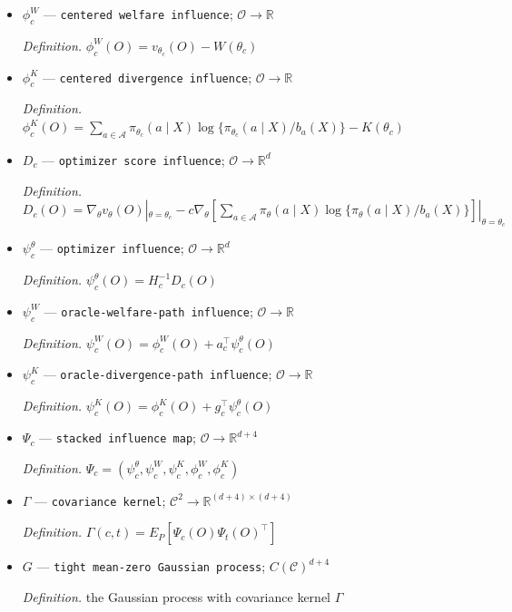 \documentclass{article}
\begin{document}
\begin{itemize}
  \item \(\phi^W_c\) --- \texttt{centered welfare influence}; \(\mathcal O\to\mathbb R\)
  \par\smallskip\noindent\emph{Definition.} \(\phi^W_c(O)=v_{\theta_c}(O)-W(\theta_c)\)
  \item \(\phi^K_c\) --- \texttt{centered divergence influence}; \(\mathcal O\to\mathbb R\)
  \par\smallskip\noindent\emph{Definition.} \(\phi^K_c(O)=\sum_{a\in\mathcal A}\pi_{\theta_c}(a\mid X)\log\{\pi_{\theta_c}(a\mid X)/b_a(X)\}-K(\theta_c)\)
  \item \(D_c\) --- \texttt{optimizer score influence}; \(\mathcal O\to\mathbb R^d\)
  \par\smallskip\noindent\emph{Definition.} \(D_c(O)=\nabla_\theta v_\theta(O)|_{\theta=\theta_c}-c\nabla_\theta[\sum_{a\in\mathcal A}\pi_\theta(a\mid X)\log\{\pi_\theta(a\mid X)/b_a(X)\}]|_{\theta=\theta_c}\)
  \item \(\psi^\theta_c\) --- \texttt{optimizer influence}; \(\mathcal O\to\mathbb R^d\)
  \par\smallskip\noindent\emph{Definition.} \(\psi^\theta_c(O)=H_c^{-1}D_c(O)\)
  \item \(\psi^W_c\) --- \texttt{oracle-\allowbreak{}welfare-\allowbreak{}path influence}; \(\mathcal O\to\mathbb R\)
  \par\smallskip\noindent\emph{Definition.} \(\psi^W_c(O)=\phi^W_c(O)+a_c^\top\psi^\theta_c(O)\)
  \item \(\psi^K_c\) --- \texttt{oracle-\allowbreak{}divergence-\allowbreak{}path influence}; \(\mathcal O\to\mathbb R\)
  \par\smallskip\noindent\emph{Definition.} \(\psi^K_c(O)=\phi^K_c(O)+g_c^\top\psi^\theta_c(O)\)
  \item \(\Psi_c\) --- \texttt{stacked influence map}; \(\mathcal O\to\mathbb R^{d+4}\)
  \par\smallskip\noindent\emph{Definition.} \(\Psi_c=(\psi^\theta_c,\psi^W_c,\psi^K_c,\phi^W_c,\phi^K_c)\)
  \item \(\Gamma\) --- \texttt{covariance kernel}; \(\mathcal C^2\to\mathbb R^{(d+4)\times(d+4)}\)
  \par\smallskip\noindent\emph{Definition.} \(\Gamma(c,t)=E_P[\Psi_c(O)\Psi_t(O)^\top]\)
  \item \(G\) --- \texttt{tight mean-\allowbreak{}zero Gaussian process}; \(C(\mathcal C)^{d+4}\)
  \par\smallskip\noindent\emph{Definition.} the Gaussian process with covariance kernel \(\Gamma\)

\end{itemize}
\end{document}
